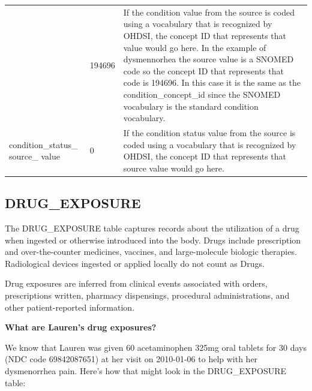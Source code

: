 \documentclass[11pt]{book}
\theoremstyle{definition}
\theoremstyle{definition}
\theoremstyle{definition}
\theoremstyle{remark}
\begin{document}
\begin{longtable}[]{@{}lll@{}}
\begin{minipage}[t]{0.28\columnwidth}
\end{minipage} & \begin{minipage}[t]{0.15\columnwidth}\raggedright
194696\strut
\end{minipage} & \begin{minipage}[t]{0.49\columnwidth}\raggedright
If the condition value from the source is coded using a vocabulary that is recognized by OHDSI, the concept ID that represents that value would go here. In the example of dysmennorhea the source value is a SNOMED code so the concept ID that represents that code is 194696. In this case it is the same as the condition\_concept\_id since the SNOMED vocabulary is the standard condition vocabulary.\strut
\end{minipage}\tabularnewline
\begin{minipage}[t]{0.28\columnwidth}\raggedright
condition\_status\_ source\_ value\strut
\end{minipage} & \begin{minipage}[t]{0.15\columnwidth}\raggedright
0\strut
\end{minipage} & \begin{minipage}[t]{0.49\columnwidth}\raggedright
If the condition status value from the source is coded using a vocabulary that is recognized by OHDSI, the concept ID that represents that source value would go here.\strut
\end{minipage}\tabularnewline
\bottomrule
\end{longtable}

\hypertarget{drugExposure}{%
\subsection{DRUG\_EXPOSURE}\label{drugExposure}}

The DRUG\_EXPOSURE table captures records about the utilization of a drug when ingested or otherwise introduced into the body. Drugs include prescription and over-the-counter medicines, vaccines, and large-molecule biologic therapies. Radiological devices ingested or applied locally do not count as Drugs.

Drug exposures are inferred from clinical events associated with orders, prescriptions written, pharmacy dispensings, procedural administrations, and other patient-reported information.

\textbf{What are Lauren's drug exposures?}

We know that Lauren was given 60 acetaminophen 325mg oral tablets for 30 days (NDC code 69842087651) at her visit on 2010-01-06 to help with her dysmenorrhea pain. Here's how that might look in the DRUG\_EXPOSURE table:
\end{document}
